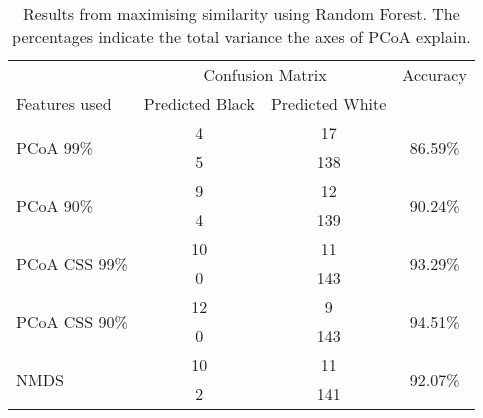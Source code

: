\begin{table}[h]
	\centering
	\begin{tabular}{l c  c c}
		\toprule
		&\multicolumn{2}{c}{Confusion Matrix} & Accuracy\\
		Features used & Predicted Black&Predicted White&\\
		\midrule
		\multirow{2}{*}{PCoA 99\%} &4 &17&\multirow{2}{*}{86.59\%}\\
		&	 5&138&\\
		\cmidrule{2-3}
		\multirow{2}{*}{PCoA 90\%} &9 &12&\multirow{2}{*}{90.24\%}\\
		&	 4&139&\\
		\cmidrule{2-3}
		\multirow{2}{*}{PCoA CSS 99\%} &10 &11&\multirow{2}{*}{93.29\%}\\
		&	 0&143&\\
		\cmidrule{2-3}
		\multirow{2}{*}{PCoA CSS 90\%} &12 &9&\multirow{2}{*}{94.51\%}\\
		&	 0&143&\\
		\cmidrule{2-3}
		\multirow{2}{*}{NMDS}&10 &11&\multirow{2}{*}{92.07\%}\\
		&	 2&141&\\
		\bottomrule
	\end{tabular}
	\caption{Results from maximising similarity using Random Forest. The percentages indicate the total variance the axes of PCoA explain.}
	\label{table:rfrsimilarityappendix}
\end{table}






